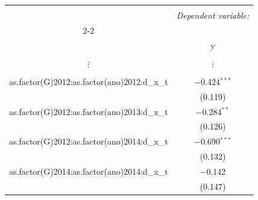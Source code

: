 \documentclass[portugues]{article}
\begin{document}
\begin{box_code}
     \begingroup
        \fontsize{8pt}{12pt}\selectfont
        \begin{center}
         \begin{tabular}{@{\extracolsep{5pt}}cc} 
         \\[-1.8ex]\hline 
         \hline \\[-1.8ex] 
          & \multicolumn{1}{c}{\textit{Dependent variable:}} \\ 
         \cline{2-2} 
         \\[-1.8ex] & y \\ 
         \hline \\[-1.8ex] 
            $\vdots$ & $\vdots$ \\
            & \\
             as.factor(G)2012:as.factor(ano)2012:d\_x\_t & $-$0.424$^{***}$ \\ 
          & (0.119) \\ 
         as.factor(G)2012:as.factor(ano)2013:d\_x\_t & $-$0.284$^{**}$ \\ 
          & (0.126) \\ 
         as.factor(G)2012:as.factor(ano)2014:d\_x\_t & $-$0.690$^{***}$ \\ 
          & (0.132) \\ 
         as.factor(G)2014:as.factor(ano)2014:d\_x\_t & $-$0.142 \\ 
          & (0.147) \\ 
        \end{tabular} 
        \end{center}
     \endgroup


\end{box_code}
\end{document}
